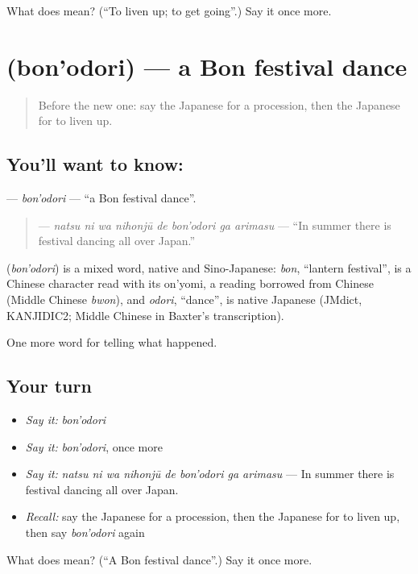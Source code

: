 \begin{tcolorbox}[breakable,colback=teal!4,colframe=teal!35!black,title={Before you move on}]
What does  mean? (\textquotedblleft{}To liven up; to get going\textquotedblright{}.) Say it once more.
\end{tcolorbox}
\section[\texorpdfstring{\ja{ぼんおどり} (bon'odori)}{ぼんおどり (bon'odori)}]{ (bon'odori) — a Bon festival dance}

\label{lesson:JA-C294-bon-odori}



\begin{quote}
Before the new one: say the Japanese for a procession, then the Japanese for to liven up.
\end{quote}

\subsection*{You'll want to know: }
\textbf{} — \emph{bon'odori} — \textquotedblleft{}a Bon festival dance\textquotedblright{}.

\begin{quote}
\textbf{   } — \emph{natsu ni wa nihonjū de bon'odori ga arimasu} — \textquotedblleft{}In summer there is festival dancing all over Japan.\textquotedblright{}
\end{quote}

\begin{cousinweb}
\textbf{} (\emph{bon'odori}) is a mixed word, native and Sino-Japanese: \emph{bon}, \textquotedblleft{}lantern festival\textquotedblright{}, is a Chinese character read with its on'yomi, a reading borrowed from Chinese (Middle Chinese \emph{bwon}), and \emph{odori}, \textquotedblleft{}dance\textquotedblright{}, is native Japanese (JMdict, KANJIDIC2; Middle Chinese in Baxter's transcription).
\end{cousinweb}

\begin{grammarlens}[title={What you've built}]
One more word for telling what happened.
\end{grammarlens}

\subsection*{Your turn}
\begin{itemize}
\raggedright
  \item \emph{Say it:} \emph{bon'odori}
  \item \emph{Say it:} \emph{bon'odori}, once more
  \item \emph{Say it:} \emph{natsu ni wa nihonjū de bon'odori ga arimasu} — In summer there is festival dancing all over Japan.
  \item \emph{Recall:} say the Japanese for a procession, then the Japanese for to liven up, then say \emph{bon'odori} again
\end{itemize}

\begin{tcolorbox}[breakable,colback=teal!4,colframe=teal!35!black,title={Before you move on}]
What does  mean? (\textquotedblleft{}A Bon festival dance\textquotedblright{}.) Say it once more.
\end{tcolorbox}
